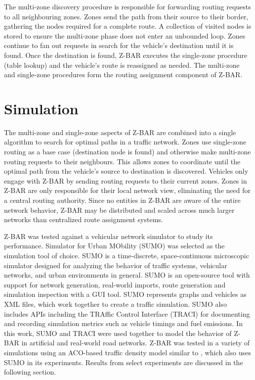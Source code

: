 \documentclass[conference]{IEEEtran}
\begin{document}

The multi-zone discovery procedure is responsible for forwarding routing requests to all neighbouring zones. Zones send the path from their source to their border, gathering the nodes required for a complete route. A collection of visited nodes is stored to ensure the multi-zone phase does not enter an unbounded loop. Zones continue to fan out requests in search for the vehicle's destination until it is found. Once the destination is found, Z-BAR executes the single-zone procedure (table lookup) and the vehicle's route is reassigned as needed. The multi-zone and single-zone procedures form the routing assignment component of Z-BAR.

\section{Simulation}

The multi-zone and single-zone aspects of Z-BAR are combined into a single algorithm to search for optimal paths in a traffic network. Zones use single-zone routing as a base case (destination node is found) and otherwise make multi-zone routing requests to their neighbours. This allows zones to coordinate until the optimal path from the vehicle's source to destination is discovered. Vehicles only engage with Z-BAR by sending routing requests to their current zones. Zones in Z-BAR are only responsible for their local network view, eliminating the need for a central routing authority. Since no entities in Z-BAR are aware of the entire network behavior, Z-BAR may be distributed and scaled across much larger networks than centralized route assignment systems.

Z-BAR was tested against a vehicular network simulator to study its performance. Simulator for Urban MObility (SUMO) \cite{sumo} was selected as the simulation tool of choice. SUMO is a time-discrete, space-continuous microscopic simulator designed for analyzing the behavior of traffic systems, vehicular networks, and urban environments in general. SUMO is an open-source tool with support for network generation, real-world imports, route generation and simulation inspection with a GUI tool. SUMO represents graphs and vehicles as XML files, which work together to create a traffic simulation. SUMO also includes APIs including the TRAffic Control Interface (TRACI) \cite{traci} for documenting and recording simulation metrics such as vehicle timings and fuel emissions. In this work, SUMO and TRACI were used together to model the behavior of Z-BAR in artificial and real-world road networks. Z-BAR was tested in a variety of simulations using an ACO-based traffic density model similar to \cite{iaco}, which also uses SUMO in its experiments. Results from select experiments are discussed in the following section.
\end{document}
